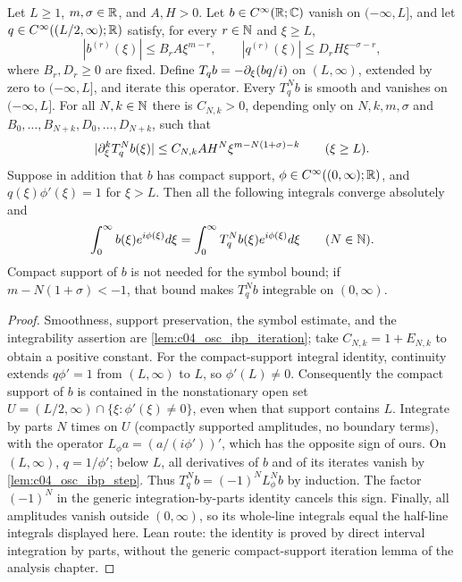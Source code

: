 \begin{lemma}
  \label{lem:c04_osc_ibp_transfer}
  Let $L\ge1$, $m,\sigma\in\mathbb{R}$, and $A,H>0$.
  Let $b\in C^\infty(\mathbb{R};\mathbb{C})$ vanish on $(-\infty,L]$, and let
  $q\in C^\infty((L/2,\infty);\mathbb{R})$ satisfy, for every $r\in\mathbb{N}$ and $\xi\ge L$,
  \[
    |b^{(r)}(\xi)|\le B_r A\xi^{m-r},\qquad
    |q^{(r)}(\xi)|\le D_r H\xi^{-\sigma-r},
  \]
  where $B_r,D_r\ge0$ are fixed. Define $T_qb=-\partial_\xi(bq/i)$ on $(L,\infty)$,
  extended by zero to $(-\infty,L]$, and iterate this operator.
  Every $T_q^Nb$ is smooth and vanishes on $(-\infty,L]$. For all $N,k\in\mathbb{N}$
  there is $C_{N,k}>0$, depending only on $N,k,m,\sigma$ and
  $B_0,\ldots,B_{N+k},D_0,\ldots,D_{N+k}$, such that
  \[
    |\partial_\xi^kT_q^Nb(\xi)|
       \le C_{N,k} A H^N\xi^{m-N(1+\sigma)-k}\qquad(\xi\ge L).
  \]
  Suppose in addition that $b$ has compact support, $\phi\in C^\infty((0,\infty);\mathbb{R})$,
  and $q(\xi)\phi'(\xi)=1$ for $\xi>L$. Then all the following integrals converge absolutely and
  \[
    \int_0^\infty b(\xi)e^{i\phi(\xi)}d\xi
      =\int_0^\infty T_q^Nb(\xi)e^{i\phi(\xi)}d\xi\qquad(N\in\mathbb{N}).
  \]
  Compact support of $b$ is not needed for the symbol bound; if
  $m-N(1+\sigma)<-1$, that bound makes $T_q^Nb$ integrable on $(0,\infty)$.
\end{lemma}
\begin{proof}
  Smoothness, support preservation, the symbol estimate, and the integrability assertion
  are \cref{lem:c04_osc_ibp_iteration}; take $C_{N,k}=1+E_{N,k}$ to obtain a positive constant.
  For the compact-support integral identity, continuity extends $q\phi'=1$ from
  $(L,\infty)$ to $L$, so $\phi'(L)\ne0$. Consequently the compact support of $b$ is
  contained in the nonstationary open set
  $U=(L/2,\infty)\cap\{\xi:\phi'(\xi)\ne0\}$, even when that support contains $L$.
  Integrate by parts $N$ times on $U$ (compactly supported amplitudes, no boundary terms), with
  the operator $L_\phi a=(a/(i\phi'))'$, which has the opposite sign of ours.
  On $(L,\infty)$, $q=1/\phi'$; below $L$, all derivatives of $b$ and of its iterates
  vanish by \cref{lem:c04_osc_ibp_step}. Thus
  $T_q^Nb=(-1)^NL_\phi^Nb$ by induction.
  The factor $(-1)^N$ in the generic integration-by-parts identity cancels this sign.
  Finally, all amplitudes vanish outside $(0,\infty)$, so its whole-line integrals
  equal the half-line integrals displayed here.
  Lean route: the identity is proved by direct interval integration by parts, without the generic compact-support iteration lemma of the analysis chapter.
\end{proof}

